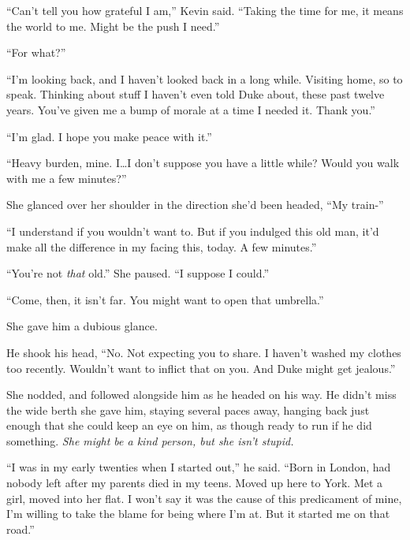 ``Can't tell you how grateful I am,'' Kevin said.  ``Taking the time for me, it means the world to me.  Might be the push I need.''



``For what?''



``I'm looking back, and I haven't looked back in a long while.  Visiting home, so to speak.  Thinking about stuff I haven't even told Duke about, these past twelve years.  You've given me a bump of morale at a time I needed it.  Thank you.''



``I'm glad.  I hope you make peace with it.''



``Heavy burden, mine.  I\ldots I don't suppose you have a little while?  Would you walk with me a few minutes?''



She glanced over her shoulder in the direction she'd been headed, ``My train-''



``I understand if you wouldn't want to.  But if you indulged this old man, it'd make all the difference in my facing this, today.  A few minutes.''



``You're not \emph{that} old.''  She paused.  ``I suppose I could.''



``Come, then, it isn't far.  You might want to open that umbrella.''



She gave him a dubious glance.



He shook his head, ``No.  Not expecting you to share.  I haven't washed my clothes too recently.  Wouldn't want to inflict that on you.  And Duke might get jealous.''



She nodded, and followed alongside him as he headed on his way.  He didn't miss the wide berth she gave him, staying several paces away, hanging back just enough that she could keep an eye on him, as though ready to run if he did something.  \emph{She might be a kind person, but she isn't stupid.}



``I was in my early twenties when I started out,'' he said.  ``Born in London, had nobody left after my parents died in my teens.  Moved up here to York.  Met a girl, moved into her flat.  I won't say it was the cause of this predicament of mine, I'm willing to take the blame for being where I'm at.  But it started me on that road.''



